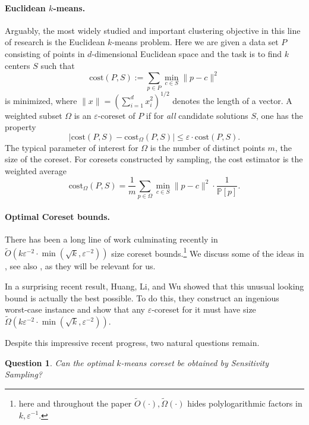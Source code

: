 \documentclass[11pt]{article}
\newtheorem{question}{Question}
\theoremstyle{restate}
\theoremstyle{definition}
\newcommand{\eps}{\ensuremath{\varepsilon}}
\begin{document}
\paragraph{Euclidean $k$-means.} Arguably, the most widely studied and important clustering objective in this line of research is the Euclidean $k$-means problem. Here we are given a data set $P$ consisting of points in $d$-dimensional Euclidean space and the task is to find $k$ centers $S$ such that \[
  \text{cost}(P,S):=\sum_{p\in P} \min_{c\in S}\|p-c\|^2  \]
is minimized, where $\|x\|=(\sum_{i=1}^d x_i^2)^{1/2}$ denotes the length of a vector. 
A weighted subset $\Omega$ is an $\varepsilon$-coreset of $P$ if for \emph{all} candidate solutions $S$, one has the property
\[|\text{cost}(P,S)-\text{cost}_\Omega(P,S)|\leq \varepsilon\cdot \text{cost}(P,S).\]
The typical parameter of interest for $\Omega$ is the number of distinct points $m$, the size of the coreset. For coresets constructed by sampling, the cost estimator is the weighted average
\begin{equation}
\label{eq:estimator}
 \text{cost}_\Omega(P,S)  = \frac{1}{m}\sum_{p\in \Omega} \min_{c\in S}\|p-c\|^2 \cdot \frac{1}{\mathbb{P}[p]}.
\end{equation}


\paragraph{Optimal Coreset bounds.} There has been a long line of work \cite{Chen09,FL11,LS10,FeldmanSS20,BecchettiBC0S19,huang2020coresets} culminating recently \cite{CSS21,Cohen-AddadLSSS22} in  $\tilde{O}(k\varepsilon^{-2}\cdot \min(\sqrt{k},\varepsilon^{-2}))$ size coreset bounds.\footnote{here and throughout the paper $\tilde{O}(\cdot), \tilde{\Omega}(\cdot)$ hides polylogarithmic factors in $k,\eps^{-1}$.} We discuss some of the ideas in , see also 
 , as they will be relevant for us. 

In a surprising recent result,  Huang, Li, and Wu \cite{HLW23}  showed that this unusual looking bound is actually the best possible. To do this, they construct an ingenious worst-case instance and show that any $\varepsilon$-coreset for it must have size  $\tilde{\Omega}(k\varepsilon^{-2}\cdot \min(\sqrt{k},\varepsilon^{-2}))$.


Despite this impressive recent progress, two natural questions remain.
\begin{question}
    Can the optimal $k$-means coreset be obtained by Sensitivity Sampling?
\end{question}
\end{document}
